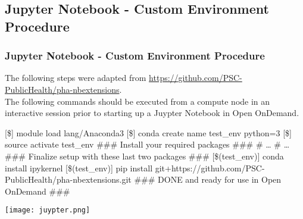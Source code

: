 \subsection[jupenv]{Jupyter Notebook - Custom Environment Procedure}
\begin{frame}[fragile]
	\frametitle{Jupyter Notebook - Custom Environment Procedure}
	\begin{block}{}
	The following steps were adapted from \url{https://github.com/PSC-PublicHealth/pha-nbextensions}.~\\The following commands should be executed from a compute node in an interactive session prior to starting up a Juypter Notebook in Open OnDemand.
	\end{block}
	\begin{semiverbatim}\footnotesize
	[\$] module load lang/Anaconda3
	[\$] conda create \ddash{}name test\_env python=3
	[\$] source activate test\_env
	\#\#\# Install your required packages \#\#\#
	\# \ldots 
	\# \ldots 
	\#\#\# Finalize setup with these last two packages \#\#\#
	[\$(test\_env)] conda install ipykernel
	[\$(test\_env)] pip install git+https://github.com/PSC-PublicHealth/pha-nbextensions.git
	\#\#\# DONE and ready for use in Open OnDemand \#\#\#
 	\end{semiverbatim}
	\vspace{-1.5em}
	\begin{center}
  \texttt{[image: juypter.png]}
	\end{center}
	
\end{frame}


